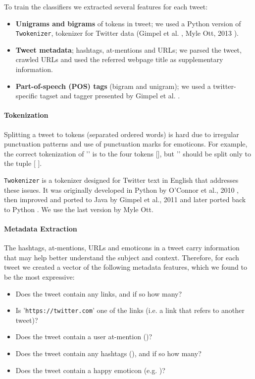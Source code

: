 \documentclass[letterpaper,twocolumn,10pt]{article}
\begin{document}
To train the classifiers we extracted several features for each tweet:

\begin{itemize}[noitemsep]
	\item \textbf{Unigrams and bigrams} of tokens in tweet; we used a Python version of \texttt{Twokenizer}, tokenizer for Twitter data (Gimpel et al. \cite{POS-Tagging}, Myle Ott, 2013 \cite{ark-twokenize-py}).
	\item \textbf{Tweet metadata}; hashtags, at-mentions and URLs; we parsed the tweet, crawled URLs and used the referred webpage title as supplementary information.
	\item \textbf{Part-of-speech (POS) tags} (bigram and unigram); we used a twitter-specific tagset and tagger presented by Gimpel et al. \cite{POS-Tagging}.
\end{itemize}

\paragraph{Tokenization}
Splitting a tweet to tokens (separated ordered words) is hard due to irregular punctuation patterns and use of punctuation marks for emoticons. For example, the correct tokenization of '' is to the four tokens [], but '' should be split only to the tuple [  ].

\texttt{Twokenizer} is a tokenizer designed for Twitter text in English that addresses these issues. It was originally developed in Python by O'Connor et al., 2010 \cite{TweetMotif}, then improved and ported to Java by Gimpel et al., 2011 \cite{POS-Tagging} and later ported back to Python \cite{ark-twokenize-py}. We use the last version by Myle Ott.

\paragraph{Metadata Extraction}
The hashtags, at-mentions, URLs and emoticons in a tweet carry information that may help better understand the subject and context. Therefore, for each tweet we created a vector of the following metadata features, which we found to be the most expressive:

\begin{itemize}[noitemsep, nolistsep]
	\item Does the tweet contain any links, and if so how many?
	\item Is '\texttt{https://twitter.com}' one of the links (i.e. a link that refers to another tweet)?
	\item Does the tweet contain a user at-mention ()?
	\item Does the tweet contain any hashtags (\tweet{\#}), and if so how many?
	\item Does the tweet contain a happy emoticon (e.g. )?
\end{itemize}
\end{document}
